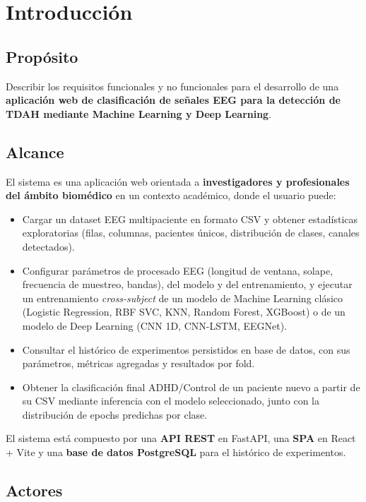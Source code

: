 
\section{Introducción}

\subsection{Propósito}

Describir los requisitos funcionales y no funcionales para el desarrollo de una \textbf{aplicación web de clasificación de señales EEG para la detección de TDAH mediante Machine Learning y Deep Learning}.

\subsection{Alcance}

El sistema es una aplicación web orientada a \textbf{investigadores y profesionales del ámbito biomédico} en un contexto académico, donde el usuario puede:

\begin{itemize}
    \item Cargar un dataset EEG multipaciente en formato CSV y obtener estadísticas exploratorias (filas, columnas, pacientes únicos, distribución de clases, canales detectados).
    \item Configurar parámetros de procesado EEG (longitud de ventana, solape, frecuencia de muestreo, bandas), del modelo y del entrenamiento, y ejecutar un entrenamiento \emph{cross-subject} de un modelo de Machine Learning clásico (Logistic Regression, RBF SVC, KNN, Random Forest, XGBoost) o de un modelo de Deep Learning (CNN 1D, CNN-LSTM, EEGNet).
    \item Consultar el histórico de experimentos persistidos en base de datos, con sus parámetros, métricas agregadas y resultados por fold.
    \item Obtener la clasificación final ADHD/Control de un paciente nuevo a partir de su CSV mediante inferencia con el modelo seleccionado, junto con la distribución de epochs predichas por clase.
\end{itemize}

El sistema está compuesto por una \textbf{API REST} en FastAPI, una \textbf{SPA} en React + Vite y una \textbf{base de datos PostgreSQL} para el histórico de experimentos.

\subsection{Actores}

